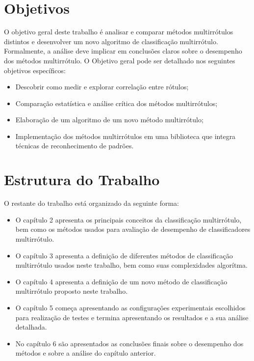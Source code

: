 \section{Objetivos}
O objetivo geral deste trabalho é analisar e comparar métodos multirrótulos distintos e 
desenvolver um novo algoritmo de classificação multirrótulo.
Formalmente, a análise deve implicar em conclusões claros
sobre o desempenho dos métodos multirrótulo.
O Objetivo geral pode ser detalhado nos seguintes objetivos específicos:
\begin{itemize}
 \item Descobrir como medir e explorar correlação entre rótulos;
 \item Comparação estatística e análise crítica dos métodos multirrótulos;
 \item Elaboração de um algoritmo de um novo método multirrótulo;
 \item Implementação dos métodos multirrótulos em uma biblioteca que integra técnicas de reconhecimento de padrões.
\end{itemize}


\section{Estrutura do Trabalho}
O restante do trabalho está organizado da seguinte forma:
\begin{itemize}
 \item O capítulo 2 apresenta os principais conceitos da classificação multirrótulo, bem como
 os métodos usados para avaliação de desempenho de classificadores multirrótulo.
 \item O capítulo 3 apresenta a definição de diferentes métodos de classificação multirrótulo usados neste trabalho,
 bem como suas complexidades algorítma.
 \item O capítulo 4 apresenta a definição de um novo método de classificação multirrótulo proposto neste trabalho.
 \item O capítulo 5 começa apresentando as configurações experimentais escolhidos para realização de testes e termina
 apresentando os resultados e a sua análise detalhada.
 \item No capítulo 6 são apresentados as conclusões finais sobre o desempenho dos métodos e sobre a análise do capítulo anterior.
\end{itemize}


